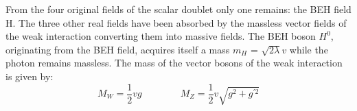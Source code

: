 From the four original fields of the scalar doublet only one remains: the BEH field H. The three other real fields have been absorbed by the massless vector fields of the weak interaction converting them into massive fields.
The BEH boson $H^{0}$, originating from the BEH field, acquires itself a mass $m_{H}$ = $\sqrt{2 \lambda}v$ while the photon remains massless. The mass of the vector bosons of the weak interaction is given by: %
\begin{equation}\label{eq::VectorBosonMasses}
 M_W = \frac{1}{2} v g \qquad \qquad M_Z = \frac{1}{2} v \sqrt{g^2 + g^{'2}}
\end{equation}

